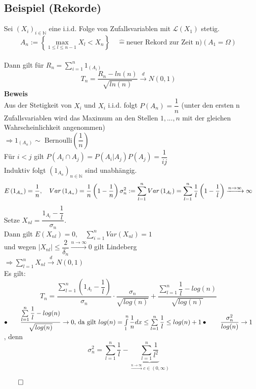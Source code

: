 \documentclass[german,10pt,oneside, fleqn, a4paper]{article}
\newcommand {\N}	{\mathbb{N}}
\newcommand{\Ra}	{\Rightarrow}
\newcommand{\ra}{\rightarrow}
\newcommand{\sm}[2][\infty]{\sum\limits_{#2}^{#1}}
\newcommand{\brc}[1]{\left(#1\right)}
\newcommand{\brac}[1]{\left\lbrace #1\right\rbrace}
\newcommand{\folge}[3][\N]{\left(#2_#3\right)_{#3\in #1}}
\newcommand{\QED}{\begin{flushright}$\qed$\end{flushright}}
\newcommand{\mc}[1]{\mathcal{#1}}
\newcommand{\beweis}{\textbf{Beweis}\\}
\newcommand{\toinf}{\rightarrow\infty}
\newcommand{\1}[1]{1_{#1}}
\newcommand{\2}[1]{\1{\brac{#1}}}
\newcommand{\xr}[2][]{\xrightarrow[#1]{#2}}
\begin{document}
\subsection{Beispiel (Rekorde)}
\label{5.9}
Sei $\folge{X}{i}$ eine i.i.d. Folge von Zufallsvariablen mit $\mc{L}(X_1)$ stetig.\\
\[A_n:=\brac{\max\limits_{1\leq l\leq n-1}X_l<X_n}\quad \widehat{=}\text{neuer Rekord zur Zeit n})(A_1=\Omega)\]\\
Dann gilt für $R_n=\sm[n]{i=1}1_(A_i)$\[
T_n=\dfrac{R_n-ln(n)}{\sqrt{ln(n)}}\xr{d}N(0,1)
\]
\beweis
Aus der Stetigkeit von $X_i$ und $X_i$ i.i.d. folgt $P(A_n)=\dfrac{1}{n}$ (unter den ersten n Zufallsvariablen wird das Maximum an den Stellen $1,...,n$ mit der gleichen Wahrscheinlichkeit angenommen)\\
$\Ra 1_(A_n)\sim$ Bernoulli$\brc{\dfrac{1}{n}}$\\
Für $i<j$ gilt $P(A_i\cap A_j)=P(A_i|A_j)P(A_j)=\dfrac{1}{ij}$\\
Induktiv folgt $\brc{1_{A_n}}_{n\in\N}$ sind unabhängig.\[
E\brc{1_{A_n}}=\dfrac{1}{n},\quad Var\brc{1_{A_n}}=\dfrac{1}{n}\brc{1-\dfrac{1}{n}}\\
\sigma_n^2:=\sm[n]{l=1}Var\brc{1_{A_l}}=\sm[n]{l=1}\dfrac{1}{l}\brc{1-\dfrac{1}{l}}\xr{n\toinf}\infty
\]
Setze $X_{nl}=\dfrac{1_{A_l}-\dfrac{1}{l}}{\sigma_n}$.\\
Dann gilt $E(X_{nl})=0,\quad \sm[n]{i=1}Var\brc{X_{nl}}=1$ \\
und wegen $|X_{nl}|\leq\dfrac{2}{\delta_n}\xr{n\toinf}0$ gilt Lindeberg\\
$\Ra\sm[n]{l=1}X_{nl}\xr{d}N(0,1)$\\
Es gilt:\[
T_n=\dfrac{\sm[n]{l=1}\brc{1_{A_l}-\dfrac{1}{l}}}{\sigma_n}\cdot\dfrac{\sigma_n}{\sqrt{log(n)}}+\dfrac{\sm[n]{l=1}\dfrac{1}{l}-log(n)}{\sqrt{log(n)}}\]
$\bullet\qquad\dfrac{\sm[n]{l=1}\dfrac{1}{l}-log(n)}{\sqrt{log(n)}}\ra 0\text{, da gilt }log(n)=\int\limits_1^n\dfrac{1}{n}dx\leq\sm[n]{l=1}\dfrac{1}{l}\leq log(n)+1\\
\bullet\qquad\dfrac{\sigma_n^2}{log(n)}\ra 1$, denn\[
\sigma_n^2=\sm[n]{l=1}\dfrac{1}{l}-\underbrace{\sm[n]{l=1}\dfrac{1}{l^2}}_{\xr{n\toinf}c\in(0,\infty)}
\]\QED
\end{document}
